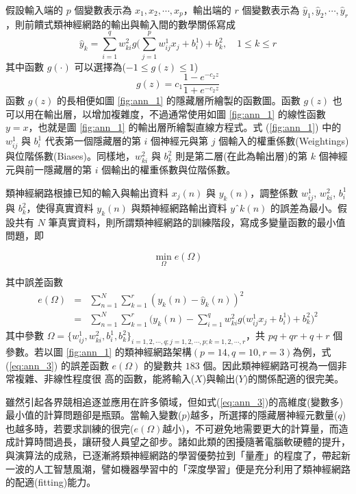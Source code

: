 假設輸入端的 $p$ 個變數表示為 $x_1, x_2, \cdots, x_p$，輸出端的 $r$ 個變數表示為 $\hat{y}_1, \hat{y}_2, \cdots, \hat{y}_r$，則前饋式類神經網路的輸出與輸入間的數學關係寫成
\begin{equation}\label{eq:ann_1}
\hat{y}_k = \sum_{i = 1}^q w_{ki}^2 g\bigg(\sum_{j = 1}^p w_{ij}^1 x_j + b_i^1\bigg) + b_k^2, \quad 1 \leq k \leq r
\end{equation}
其中函數 $g(·)$ 可以選擇為($−1 \leq g(z) \leq 1$)
\begin{equation}\label{eq:ann_2}
g(z) = c_1 \frac{1 - e^{-c_2 z}}{1 + e^{-c_2 z}}
\end{equation}
函數 $g(z)$ 的長相便如圖 \ref{fig:ann_1} 的隱藏層所繪製的函數圖。函數 $g(z)$ 也可以用在輸出層，以增加複雜度，不過通常使用如圖 \ref{fig:ann_1} 的線性函數 $y = x$，也就是圖 \ref{fig:ann_1} 的輸出層所繪製直線方程式。式 (\ref{fig:ann_1}) 中的 $w_{ij}^1$ 與 $b_i^1$ 代表第一個隱藏層的第 $i$ 個神經元與第 $j$ 個輸入的權重係數(Weightings)與位階係數(Biases)。同樣地，$w_{ki}^2$ 與 $b_k^2$ 則是第二層(在此為輸出層)的第 $k$ 個神經元與前一隱藏層的第 $i$ 個輸出的權重係數與位階係數。

類神經網路根據已知的輸入與輸出資料 $x_j(n)$ 與 $y_k(n)$，調整係數 $w_{ij}^1$, $w_{ki}^2$, $b_i^1$ 與 $b_k^2$，使得真實資料 $y_k(n)$ 與類神經網路輸出資料 $yˆk(n)$ 的誤差為最小。假設共有 $N$ 筆真實資料，則所謂類神經網路的訓練階段，寫成多變量函數的最小值問題，即

\begin{equation}\label{eq:ann_3}
\mathop{\min}\limits_{\Omega} e(\Omega)
\end{equation}

其中誤差函數
\begin{eqnarray}
e(\Omega) & = & \sum_{n = 1}^N \sum_{k = 1}^r (y_k(n) - \hat{y}_k(n))^2 \nonumber \\
& = & \sum_{n = 1}^N \sum_{k = 1}^r \bigg(y_k(n) - \sum_{i = 1}^q w_{ki}^2 g\bigg(w_{ij}^1 x_j + b_i^1 \bigg) + b_k^2 \bigg)^2
\end{eqnarray}
其中參數 $\Omega = \{w_{ij}^1, w_{ki}^2, b_i^1, b_k^2\}_{i = 1, 2, \cdots, q;j = 1, 2, \cdots, p; k = 1, 2, \cdots, r}$，共 $pq + qr + q + r$ 個參數。若以圖 \ref{fig:ann_1} 的類神經網路架構$(p = 14, q = 10, r = 3)$為例，式 (\ref{eq:ann_3}) 的誤差函數 $e(\Omega)$ 的變數共 $183$ 個。因此類神經網路可視為一個非常複雜、非線性程度很
高的函數，能將輸入($X$)與輸出($Y$)的關係配適的很完美。

雖然引起各界競相追逐並應用在許多領域，但如式(\ref{eq:ann_3})的高維度(變數多)最小值的計算問題卻是瓶頸。當輸入變數($p$)越多，所選擇的隱藏層神經元數量($q$)也越多時，若要求訓練的很完($e(\Omega)$越小)，不可避免地需要更大的計算量，而造成計算時間過長，讓研發人員望之卻步。諸如此類的困擾隨著電腦軟硬體的提升，與演算法的成熟，已逐漸將類神經網路的學習優勢拉到「量產」的程度了，帶起新一波的人工智慧風潮，譬如機器學習中的「深度學習」便是充分利用了類神經網路的配適(fitting)能力。

